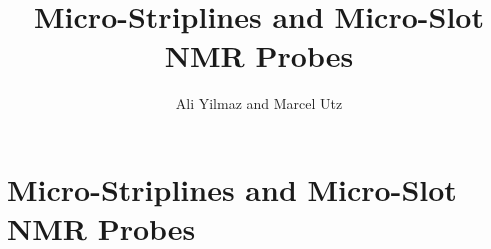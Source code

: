 \documentclass[]{book}
\title{Micro-Striplines and Micro-Slot NMR Probes}
\author{Ali Yilmaz and Marcel Utz}
\begin{document}
	\maketitle

	\chapter{Micro-Striplines and Micro-Slot NMR Probes}
	
	
	
	
	
	
	
	
	
\end{document}
